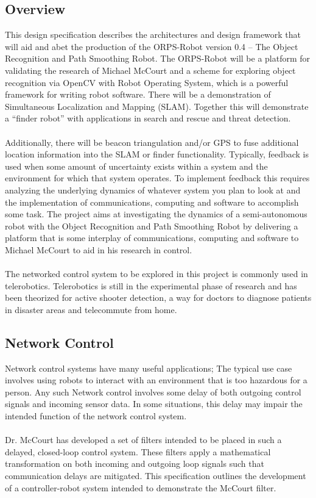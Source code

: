 \documentclass[english,12pt]{article}
\begin{document}
\subsection{Overview}
This design specification describes the architectures and design framework that will aid and abet the
production of the ORPS-Robot version 0.4 – The Object Recognition and Path Smoothing Robot. The
ORPS-Robot will be a platform for validating the research of Michael McCourt and a scheme for
exploring object recognition via OpenCV with Robot Operating System, which is a powerful framework
for writing robot software. There will be a demonstration of Simultaneous Localization and Mapping
(SLAM). Together this will demonstrate a “finder robot” with applications in search and rescue and
threat detection.\\\\
Additionally, there will be beacon triangulation and/or GPS to fuse additional location information into
the SLAM or finder functionality. Typically, feedback is used when some amount of uncertainty exists
within a system and the environment for which that system operates. To implement feedback this
requires analyzing the underlying dynamics of whatever system you plan to look at and the
implementation of communications, computing and software to accomplish some task. The project aims
at investigating the dynamics of a semi-autonomous robot with the Object Recognition and Path
Smoothing Robot by delivering a platform that is some interplay of communications, computing and
software to Michael McCourt to aid in his research in control.\\\\
The networked control system to be explored in this project is commonly used in telerobotics.
Telerobotics is still in the experimental phase of research and has been theorized for active shooter
detection, a way for doctors to diagnose patients in disaster areas and telecommute from home.
\subsection{Network Control}
Network control systems have many useful applications; The typical use case involves using robots to
interact with an environment that is too hazardous for a person. Any such Network control involves
some delay of both outgoing control signals and incoming sensor data. In some situations, this delay
may impair the intended function of the network control system.\\\\
Dr. McCourt has developed a set of filters intended to be placed in such a delayed, closed-loop control
system. These filters apply a mathematical transformation on both incoming and outgoing loop signals
such that communication delays are mitigated. This specification outlines the development of a
controller-robot system intended to demonstrate the McCourt filter.
\end{document}
